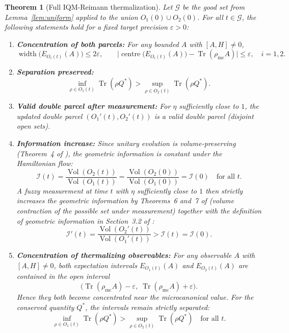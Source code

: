 \documentclass[11pt, onecolumn]{article}
\newtheorem{theorem}{Theorem}
\begin{document}
\begin{theorem}[Full IQM-Reimann thermalization]
\label{thm:full}
Let \(\mathcal{G}\) be the good set from Lemma~\ref{lem:uniform} applied to the union \(O_1(0)\cup O_2(0)\). For all \(t\in\mathcal{G}\), the following statements hold for a fixed target precision \(\varepsilon > 0\):
\begin{enumerate}
    \item \textbf{Concentration of both parcels:} For any bounded \(A\) with \([A,H]\neq 0\),
    \[
    \operatorname{width}\bigl(E_{O_i(t)}(A)\bigr) \le 2\varepsilon,\qquad
    \bigl|\operatorname{centre}\bigl(E_{O_i(t)}(A)\bigr)-\operatorname{Tr}(\rho_{\mathrm{mc}}A)\bigr| \le \varepsilon,\quad i=1,2.
    \]
    \item \textbf{Separation preserved:}
    \[
    \inf_{\rho\in O_1(t)}\operatorname{Tr}(\rho Q^*) > \sup_{\rho\in O_2(t)}\operatorname{Tr}(\rho Q^*).
    \]
    \item \textbf{Valid double parcel after measurement:} For \(\eta\) sufficiently close to \(1\), the updated double parcel \((O_1'(t),O_2'(t))\) is a valid double parcel (disjoint open sets).
    \item \textbf{Information increase:} 
    Since unitary evolution is volume-preserving (Theorem~4 of \cite{Edalat2026}), the geometric information is constant under the Hamiltonian flow:
    \[
    \mathcal{I}(t) = \frac{\operatorname{Vol}(O_2(t))}{\operatorname{Vol}(O_1(t))}
    = \frac{\operatorname{Vol}(O_2(0))}{\operatorname{Vol}(O_1(0))} = \mathcal{I}(0) \quad \text{for all } t.
    \]
    A fuzzy measurement at time \(t\) with \(\eta\) sufficiently close to \(1\) then strictly increases the geometric information by Theorems~6 and~7 of \cite{Edalat2026} (volume contraction of the possible set under measurement) together with the definition of geometric information in Section~3.2 of \cite{Edalat2026}:
    \[
    \mathcal{I}'(t) = \frac{\operatorname{Vol}(O_2'(t))}{\operatorname{Vol}(O_1'(t))}
    > \mathcal{I}(t) = \mathcal{I}(0).
    \]
    \item \textbf{Concentration of thermalizing observables:} For any observable \(A\) with \([A,H]\neq 0\), both expectation intervals \(E_{O_1(t)}(A)\) and \(E_{O_2(t)}(A)\) are contained in the open interval
    \[
    \bigl(\operatorname{Tr}(\rho_{\mathrm{mc}}A)-\varepsilon,\; \operatorname{Tr}(\rho_{\mathrm{mc}}A)+\varepsilon\bigr).
    \]
    Hence they both become concentrated near the microcanonical value. For the conserved quantity \(Q^*\), the intervals remain strictly separated:
    \[
    \inf_{\rho\in O_1(t)}\operatorname{Tr}(\rho Q^*) > \sup_{\rho\in O_2(t)}\operatorname{Tr}(\rho Q^*) \quad \text{for all } t.
    \]
\end{enumerate}
\end{theorem}
\end{document}
